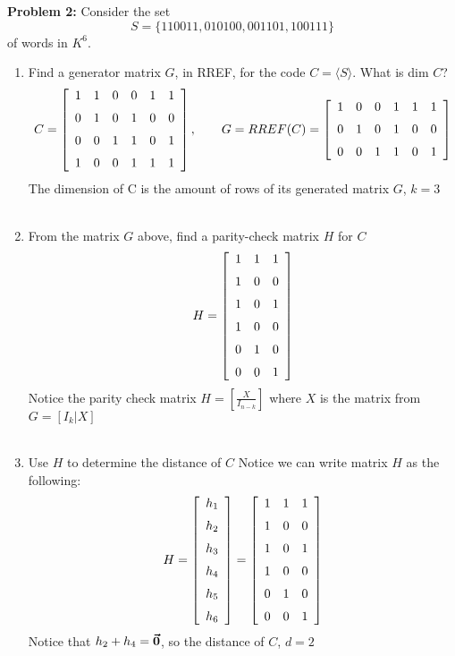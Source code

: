 \documentclass[11pt]{article}
\newcommand{\bmath}[1]{\text{\boldmath$#1$\unboldmath}}
\newenvironment{problem}[1]{\textbf{Problem #1: }}{\newpage}
\begin{document}
	\begin{problem}{2}
		Consider the set
		\[S = \{110011, 010100, 001101, 100111\}\]
		of words in $K^6$.
		\begin{enumerate}[label = (\alph*)]
			\item Find a generator matrix $G$, in RREF, for the code $C = \langle S \rangle$. What is dim $C$?
			\[C =  \left[ \begin {array}{cccccc} 1&1&0&0&1&1\\ \noalign{\medskip}0&1&0&1
			&0&0\\ \noalign{\medskip}0&0&1&1&0&1\\ \noalign{\medskip}1&0&0&1&1&1
			\end {array} \right], \qquad G = RREF(C) =  \left[ \begin {array}{cccccc} 1&0&0&1&1&1\\ \noalign{\medskip}0&1&0&1
			&0&0\\ \noalign{\medskip}0&0&1&1&0&1
			\end {array} \right]  \]
			The dimension of C is the amount of rows of its generated matrix $G$, $k = 3$
			\\ \\
			\item From the matrix $G$ above, find a parity-check matrix $H$ for $C$
			\[H =  \left[ \begin {array}{ccc} 1&1&1\\ \noalign{\medskip}1&0&0
			\\ \noalign{\medskip}1&0&1 \\ \noalign{\medskip} 1&0&0\\ \noalign{\medskip}0&1&0
			\\ \noalign{\medskip}0&0&1
			\end {array} \right] 
			\]
			Notice the parity check matrix $H = \left[\frac{X}{I_{n-k}}\right]$ where $X$ is the matrix from $G = [I_k | X]$
			\\ \\
			\item Use $H$ to determine the distance of $C$
			Notice we can write matrix $H$ as the following:
			\[H = \left[\begin{array}{c} h_1 \\ \noalign{\medskip} h_2 \\ \noalign{\medskip} h_3 \\ \noalign{\medskip} h_4 \\ \noalign{\medskip} h_5 \\ \noalign{\medskip} h_6 \end{array}\right] = \left[ \begin {array}{ccc} 1&1&1\\ \noalign{\medskip}1&0&0
			\\ \noalign{\medskip}1&0&1 \\ \noalign{\medskip} 1&0&0\\ \noalign{\medskip}0&1&0
			\\ \noalign{\medskip}0&0&1 \end {array} \right] \]
			Notice that $h_2 + h_4 = \bmath{\vec{0}}$, so the distance of $C$, $d = 2$
		\end{enumerate}
	\end{problem}
\end{document}
